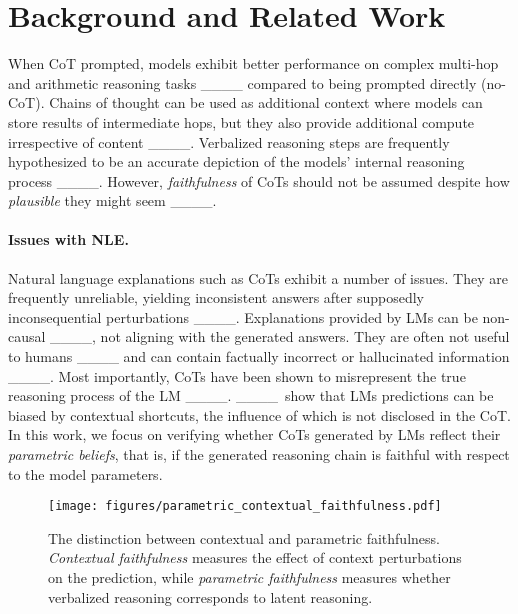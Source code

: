 \section{Background and Related Work}
%
%
%
%
%
%
%
%
%
%
%
%
%
%
%
%

%
When CoT prompted, models exhibit better performance on complex multi-hop and arithmetic reasoning tasks ____ compared to being prompted directly (no-CoT).
%
Chains of thought can be used as additional context where models can store results of intermediate hops, but they also provide additional compute irrespective of content ____.
Verbalized reasoning steps are frequently hypothesized to be an accurate depiction of the models' internal reasoning process ____. However, \textit{faithfulness} of CoTs should not be assumed despite how \textit{plausible} they might seem ____.

\paragraph{Issues with NLE.} Natural language explanations such as CoTs exhibit a number of issues. %
%
They are frequently unreliable, yielding inconsistent answers after supposedly inconsequential perturbations ____. %
Explanations provided by LMs can be non-causal ____, not aligning with the generated answers. They are often not useful to humans ____ and can contain factually incorrect or hallucinated information  ____.
Most importantly, CoTs have been shown to misrepresent the true reasoning process of the LM ____. ____\ show that LMs predictions can be biased by contextual shortcuts, the influence of which is not disclosed in the CoT.
In this work, we focus on verifying whether CoTs generated by LMs  reflect their \textit{parametric beliefs}, that is, if the generated reasoning chain is faithful with respect to the model parameters.  

\begin{figure}[t]
    \centering
    \texttt{[image: figures/parametric\_contextual\_faithfulness.pdf]}
    \caption{The distinction between contextual and parametric faithfulness. \textit{Contextual faithfulness} measures the effect of context perturbations on the prediction, while \textit{parametric faithfulness} measures whether verbalized reasoning corresponds to latent reasoning.}
    \label{fig:ctx_vs_param_ff}
\end{figure}

